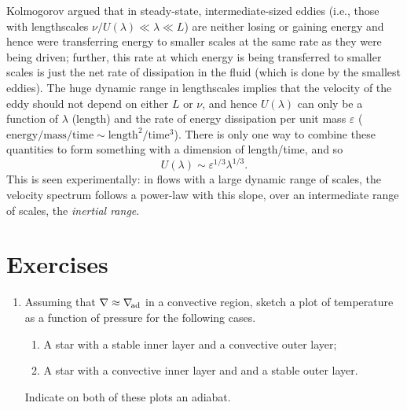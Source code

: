 Kolmogorov argued that in steady-state, intermediate-sized eddies (i.e., those with lengthscales $\nu/U(\lambda) \ll \lambda \ll L$) are neither losing or gaining energy and hence were transferring energy to smaller scales at the same rate as they were being driven; further, this rate at which energy is being transferred to smaller scales is just the net rate of dissipation in the fluid (which is done by the smallest eddies).  The huge dynamic range in lengthscales implies that the velocity of the eddy should not depend on either $L$ or $\nu$, and hence $U(\lambda)$ can only be a function of $\lambda$ (length) and the rate of energy dissipation per unit mass $\varepsilon$ ($\mathrm{energy/mass/time}\sim\mathrm{length^{2}/time^{3}}$). There is only one way to combine these quantities to form something with a dimension of length/time, and so
\begin{equation}\label{e.kolmogorov-velocity}
U(\lambda) \sim \varepsilon^{1/3}\lambda^{1/3}.
\end{equation}
This is seen experimentally: in flows with a large dynamic range of scales, the velocity spectrum follows a power-law with this slope\cite{Grant1962Turbulence-spec}, over an intermediate range of scales, the \emph{inertial range}.

\section{Exercises}
\begin{enumerate}
\item Assuming that $\nabla \approx \nabla_{\!\mathrm{ad}}$ in a convective region, sketch a plot of temperature as a function of pressure for the following cases.
\begin{enumerate}
\item A star with a stable inner layer and a convective outer layer;
\item A star with a convective inner layer and and a stable outer layer.
\end{enumerate}
Indicate on both of these plots an adiabat.
\end{enumerate}
